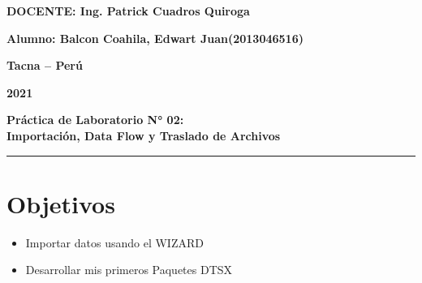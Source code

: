 \documentclass{article}
\begin{document}
\begin{titlepage}
\begin{center}
\vspace*{0.3in}
\begin{Large}
\textbf{DOCENTE: Ing. Patrick Cuadros Quiroga} \\
\end{Large}

\vspace*{0.2in}
\vspace*{0.1in}
\begin{large}

\begin{Large}
\textbf{Alumno: Balcon Coahila, Edwart Juan\hfill	(2013046516) } \\
\end{Large}

\vspace*{0.15in}
\begin{Large}
\textbf{Tacna – Perú} \\
\end{Large}

\vspace*{0.05in}
\begin{Large}
\textbf{2021 } \\
\end{Large}

\end{large}
\end{center}

\end{titlepage}


\begin{center}
\begin{LARGE}
	\textbf{Práctica de Laboratorio N° 02: \\ Importación, Data Flow y Traslado de Archivos} \\ 
\end{LARGE}
\rule{175mm}{0.1mm}
\end{center}




\section{Objetivos}

\begin{itemize}
\item Importar datos usando el WIZARD 
\item Desarrollar mis primeros Paquetes DTSX

\end{itemize}
\end{document}
